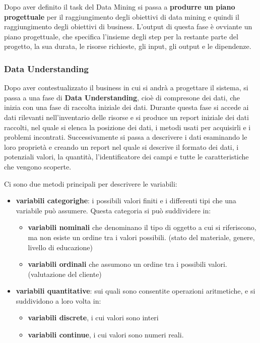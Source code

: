 \documentclass[a4paper]{extarticle}
\begin{document}
Dopo aver definito il task del Data Mining si passa a \textbf{produrre un piano progettuale} per il raggiungimento degli obiettivi di data mining e quindi il raggiungimento degli obiettivi di business. L'output di questa fase è ovviante un piano progettuale, che specifica l'insieme degli step per la restante parte del progetto, la sua durata, le risorse richieste, gli input, gli output e le dipendenze.

\subsubsection{Data Understanding}

Dopo aver contestualizzato il business in cui si andrà a progettare il sistema, si passa a una fase di \textbf{Data Understanding}, cioè di compresone dei dati, che inizia con una fase di raccolta iniziale dei dati. Durante questa fase si accede ai dati rilevanti nell'inventario delle risorse e si produce un report iniziale dei dati raccolti, nel quale si elenca la posizione dei dati, i metodi usati per acquisirli e i problemi incontrati. Successivamente si passa a descrivere i dati esaminando le loro proprietà e creando un report nel quale si descrive il formato dei dati, i potenziali valori, la quantità, l'identificatore dei campi e tutte le caratteristiche che vengono scoperte.

Ci sono due metodi principali per descrivere le variabili:

\begin{itemize}
\item \textbf{variabili categorighe}: i possibili valori finiti e i differenti tipi che una variabile può assumere. Questa categoria si può suddividere in:
	\begin{itemize}
	\item \textbf{variabili nominali} che denominano il tipo di oggetto a cui si riferiscono, ma non esiste un 	ordine tra i valori possibili. (stato del materiale, genere, livello di educazione)
	\item \textbf{variabili ordinali} che assumono un ordine tra i possibili valori. (valutazione del cliente)
	\end{itemize}

\item \textbf{variabili quantitative}: sui quali sono consentite operazioni aritmetiche, e si suddividono a loro volta in:

\begin{itemize}
	\item \textbf{variabili discrete}, i cui valori sono interi
	\item \textbf{variabili continue}, i cui valori sono numeri reali.
	\end{itemize}

\end{itemize}
\end{document}
